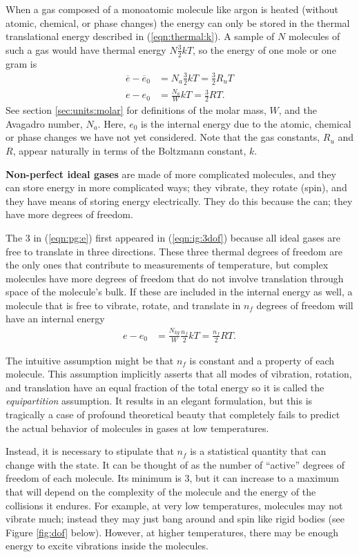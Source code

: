 When a gas composed of a monoatomic molecule like argon is heated (without atomic, chemical, or phase changes) the energy can only be stored in the thermal translational energy described in (\ref{eqn:thermal:k}).  A sample of $N$ molecules of such a gas would have thermal energy $N \frac{3}{2} k T$, so the energy of one mole or one gram is
\begin{align}
\overline{e} - \overline{e}_0 &= N_{a} \frac{3}{2} k T = \frac{3}{2} R_u T\\
e - e_0 &= \frac{N_{a}}{W} k T = \frac{3}{2} R T \label{eqn:pg:e}.
\end{align}
See section \ref{sec:units:molar} for definitions of the molar mass, $W$, and the Avagadro number, $N_{a}$.  Here, $e_0$ is the internal energy due to the atomic, chemical or phase changes we have not yet considered.  Note that the gas constants, $R_u$ and $R$, appear naturally in terms of the Boltzmann constant, $k$.

{\bf Non-perfect ideal gases} are made of more complicated molecules, and they can store energy in more complicated ways; they vibrate, they rotate (spin), and they have means of storing energy electrically.  They do this because the can; they have more degrees of freedom.

The 3 in (\ref{eqn:pg:e}) first appeared in (\ref{eqn:ig:3dof}) because all ideal gases are free to translate in three directions.  These three thermal degrees of freedom are the only ones that contribute to measurements of temperature, but complex molecules have more degrees of freedom that do not involve translation through space of the molecule's bulk.  If these are included in the internal energy as well, a molecule that is free to vibrate, rotate, and translate in $n_f$ degrees of freedom will have an internal energy
\begin{align}
e - e_0 &= \frac{N_{kg}}{W} \frac{n_f}{2} k T = \frac{n_f}{2} R T.
\end{align}

The intuitive assumption might be that $n_f$ is constant and a property of each molecule.  This assumption implicitly asserts that all modes of vibration, rotation, and translation have an equal fraction of the total energy so it is called the \emph{equipartition} assumption.  It results in an elegant formulation, but this is tragically a case of profound theoretical beauty that completely fails to predict the actual behavior of molecules in gases at low temperatures.

Instead, it is necessary to stipulate that $n_f$ is a statistical quantity that can change with the state.  It can be thought of as the number of ``active'' degrees of freedom of each molecule.  Its minimum is 3, but it can increase to a maximum that will depend on the complexity of the molecule and the energy of the collisions it endures.  For example, at very low temperatures, molecules may not vibrate much; instead they may just bang around and spin like rigid bodies (see Figure \ref{fig:dof} below).  However, at higher temperatures, there may be enough energy to excite vibrations inside the molecules.

